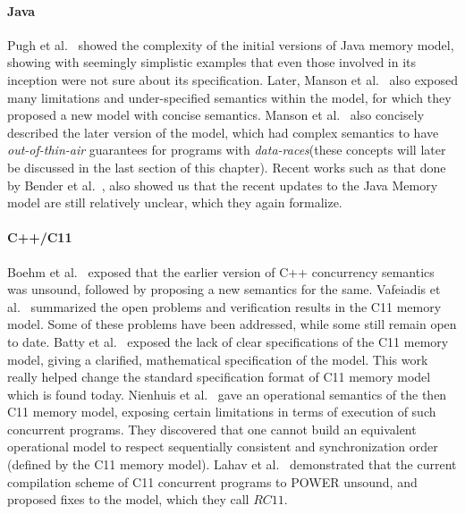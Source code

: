     \paragraph{Java}
    Pugh et al.~\cite{Pugh} showed the complexity of the initial versions of Java memory model, showing with seemingly simplistic examples that even those involved in its inception were not sure about its specification. 
    Later, Manson et al.~\cite{JeremyM} also exposed many limitations and under-specified semantics within the model, for which they proposed a new model with concise semantics. 
    Manson et al.~\cite{Manson2} also concisely described the later version of the model, which had complex semantics to have \textit{out-of-thin-air} guarantees for programs with \textit{data-races}(these concepts will later be discussed in the last section of this chapter). 
    Recent works such as that done by Bender et al.~\cite{BenderJ}, also showed us that the recent updates to the Java Memory model are still relatively unclear, which they again formalize. 
    
    \paragraph{C++/C11}
    Boehm et al.~\cite{Boehm} exposed that the earlier version of C++ concurrency semantics was unsound, followed by proposing a new semantics for the same.
    Vafeiadis et al.~\cite{Vafeiadis2} summarized the open problems and verification results in the C11 memory model. Some of these problems have been addressed, while some still remain open to date. 
    Batty et al.~\cite{BattyM} exposed the lack of clear specifications of the C11 memory model, giving a clarified, mathematical specification of the model. This work really helped change the standard specification format of C11 memory model which is found today\cite{C11MM}. 
    Nienhuis et al.~\cite{Nienhuis} gave an operational semantics of the then C11 memory model, exposing certain limitations in terms of execution of such concurrent programs. They discovered that one cannot build an equivalent operational model to respect sequentially consistent and synchronization order (defined by the C11 memory model).
    Lahav et al.~\cite{Lahav} demonstrated that the current compilation scheme of C11 concurrent programs to POWER unsound, and proposed fixes to the model, which they call $RC11$.
    
